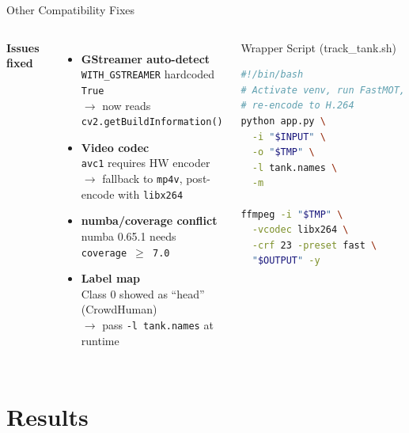 \documentclass[aspectratio=169]{beamer}
\begin{document}
\begin{frame}[fragile]{Other Compatibility Fixes}
\begin{columns}[T]
\textbf{Issues fixed}
\vspace{0.2cm}
\begin{itemize}
  \item \textbf{GStreamer auto-detect} \\
        \small \texttt{WITH\_GSTREAMER} hardcoded \texttt{True} \\
        $\rightarrow$ now reads \texttt{cv2.getBuildInformation()}
  \vspace{0.15cm}
  \item \textbf{Video codec} \\
        \small \texttt{avc1} requires HW encoder \\
        $\rightarrow$ fallback to \texttt{mp4v}, post-encode with \texttt{libx264}
  \vspace{0.15cm}
  \item \textbf{numba/coverage conflict} \\
        \small numba 0.65.1 needs \texttt{coverage $\geq$ 7.0}
  \vspace{0.15cm}
  \item \textbf{Label map} \\
        \small Class 0 showed as ``head'' (CrowdHuman) \\
        $\rightarrow$ pass \texttt{-l tank.names} at runtime
\end{itemize}

\begin{block}{Wrapper Script (track\_tank.sh)}
\begin{lstlisting}[language=bash]
#!/bin/bash
# Activate venv, run FastMOT,
# re-encode to H.264
python app.py \
  -i "$INPUT" \
  -o "$TMP" \
  -l tank.names \
  -m

ffmpeg -i "$TMP" \
  -vcodec libx264 \
  -crf 23 -preset fast \
  "$OUTPUT" -y
\end{lstlisting}
\end{block}
\end{columns}
\end{frame}

\section{Results}
\end{document}
